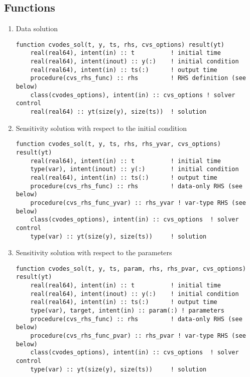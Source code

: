 \documentclass[12pt, reqno, oneside]{amsbook}
\numberwithin{equation}{chapter}
\begin{document}
\subsection{Functions}
\label{sec:org60fa4bb}
\begin{enumerate}
\item Data solution
\label{sec:orgcc001a7}
\begin{verbatim}
function cvodes_sol(t, y, ts, rhs, cvs_options) result(yt)
    real(real64), intent(in) :: t          ! initial time
    real(real64), intent(inout) :: y(:)    ! initial condition
    real(real64), intent(in) :: ts(:)      ! output time
    procedure(cvs_rhs_func) :: rhs         ! RHS definition (see below)
    class(cvodes_options), intent(in) :: cvs_options ! solver control
    real(real64) :: yt(size(y), size(ts))  ! solution
\end{verbatim}

\item Sensitivity solution  with respect to the initial condition
\label{sec:org583f3a8}
\begin{verbatim}
function cvodes_sol(t, y, ts, rhs, rhs_yvar, cvs_options) result(yt)
    real(real64), intent(in) :: t          ! initial time
    type(var), intent(inout) :: y(:)       ! initial condition
    real(real64), intent(in) :: ts(:)      ! output time
    procedure(cvs_rhs_func) :: rhs         ! data-only RHS (see below)
    procedure(cvs_rhs_func_yvar) :: rhs_yvar ! var-type RHS (see below)
    class(cvodes_options), intent(in) :: cvs_options  ! solver control
    type(var) :: yt(size(y), size(ts))     ! solution
\end{verbatim}

\item Sensitivity solution  with respect to the parameters
\label{sec:orgff72f9e}
\begin{verbatim}
function cvodes_sol(t, y, ts, param, rhs, rhs_pvar, cvs_options) result(yt)
    real(real64), intent(in) :: t          ! initial time
    real(real64), intent(inout) :: y(:)    ! initial condition
    real(real64), intent(in) :: ts(:)      ! output time
    type(var), target, intent(in) :: param(:) ! parameters
    procedure(cvs_rhs_func) :: rhs         ! data-only RHS (see below)
    procedure(cvs_rhs_func_pvar) :: rhs_pvar ! var-type RHS (see below)
    class(cvodes_options), intent(in) :: cvs_options  ! solver control
    type(var) :: yt(size(y), size(ts))     ! solution
\end{verbatim}


\end{enumerate}
\end{document}
